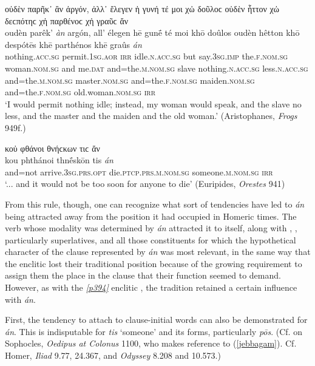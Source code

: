 \begin{exe}
\ex οὐδὲν παρῆκ᾽ ἂν ἀργόν, ἀλλ᾽ ἔλεγεν ἡ γυνή τέ μοι χὠ δοῦλοϲ οὐδὲν ἧττον χὠ δεϲπότηϲ χἠ παρθένοϲ χἠ γραῦϲ ἄν\\
\gll oudèn parêk' \emph{àn} argón, all' élegen hē gunḗ té moi khō doûlos oudèn hêtton khō despótēs khē parthénos khē graûs \emph{án}\\
nothing.\textsc{acc.sg} permit.\textsc{1sg.aor} \textsc{irr} idle.\textsc{n.acc.sg} but say.\textsc{3sg.imp} the.\textsc{f.nom.sg} woman.\textsc{nom.sg} and me.\textsc{dat} and=the.\textsc{m.nom.sg} slave nothing.\textsc{n.acc.sg} less.\textsc{n.acc.sg} and=the.\textsc{m.nom.sg} master.\textsc{nom.sg} and=the.\textsc{f.nom.sg} maiden.\textsc{nom.sg} and=the.\textsc{f.nom.sg} old.woman.\textsc{nom.sg} \textsc{irr}\\
\trans `I would permit nothing idle; instead, my woman would speak, and the slave no less, and the master and the maiden and the old woman.' (Aristophanes, \textit{Frogs} 949f.)
\label{latean1}
\end{exe}

\begin{exe}
\ex κοὐ φθάνοι θνήϲκων τιϲ ἄν\\
\gll kou phthánoi thnḗskōn tis \emph{án}\\
and=not arrive.\textsc{3sg.prs.opt} die.\textsc{ptcp.prs.m.nom.sg} someone.\textsc{m.nom.sg} \textsc{irr}\\
\trans `... and it would not be too soon for anyone to die' (Euripides, \textit{Orestes} 941)
\label{latean2}
\end{exe}

From this rule, though, one can recognize what sort of tendencies have led to \emph{án} being attracted away from the position it had occupied in Homeric times.\label{posthomerican} The verb whose modality was determined by \emph{án} attracted it to itself, along with , , particularly superlatives, and all those constituents for which the hypothetical character of the clause represented by \emph{án} was most relevant, in the same way that the enclitic  lost their traditional position because of the growing requirement to assign them the place in the clause that their function seemed to demand. However, as with the \hyperlink{p394}{\emph{[p394]}} enclitic , the tradition retained a certain influence with \emph{án}.

First, the tendency to attach to clause-initial words can also be demonstrated for \emph{án}.\label{tisposinitial} This is indisputable for \emph{tis} `someone' and its forms, particularly \emph{pōs}. (Cf. \citealp[175]{Jebb1889} on Sophocles, \textit{Oedipus at Colonus} 1100, who makes reference to (\ref{jebbagam}). Cf. Homer, \textit{Iliad} 9.77, 24.367, and \textit{Odyssey} 8.208 and 10.573.) 

